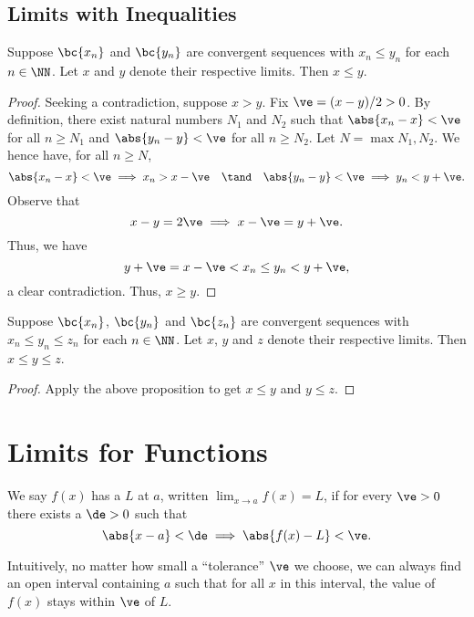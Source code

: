 \subsection{Limits with Inequalities}

\begin{proposition}
    Suppose $\bc{x_n}$ and $\bc{y_n}$ are convergent sequences with $x_n \leq y_n$ for each $n \in \NN$. Let $x$ and $y$ denote their respective limits. Then $x \leq y$.
\end{proposition}
\begin{proof}
    Seeking a contradiction, suppose $x > y$. Fix $\ve = (x-y)/2 > 0$. By definition, there exist natural numbers $N_1$ and $N_2$ such that $\abs{x_n - x} < \ve$ for all $n \geq N_1$ and $\abs{y_n - y} < \ve$ for all $n \geq N_2$. Let $N = \max{N_1, N_2}$. We hence have, for all $n \geq N$, \[\abs{x_n - x} < \ve \implies x_n > x - \ve \quad \tand \quad \abs{y_n - y} < \ve \implies y_n < y + \ve.\] Observe that \[x - y = 2\ve \implies x - \ve = y + \ve.\] Thus, we have \[y + \ve = x - \ve < x_n \leq y_n < y + \ve,\] a clear contradiction. Thus, $x \geq y$.
\end{proof}

\begin{theorem}
    Suppose $\bc{x_n}$, $\bc{y_n}$ and $\bc{z_n}$ are convergent sequences with $x_n \leq y_n \leq z_n$ for each $n \in \NN$. Let $x$, $y$ and $z$ denote their respective limits. Then $x \leq y \leq z$.
\end{theorem}
\begin{proof}
    Apply the above proposition to get $x \leq y$ and $y \leq z$.
\end{proof}

\section{Limits for Functions}

\begin{definition}
    We say $f(x)$ has a  $L$ at $a$, written $\displaystyle \lim_{x \to a} f(x) = L$, if for every $\ve > 0$ there exists a $\de > 0$ such that \[\abs{x - a} < \de \implies \abs{f(x) - L} < \ve.\]
\end{definition}

Intuitively, no matter how small a ``tolerance'' $\ve$ we choose, we can always find an open interval containing $a$ such that for all $x$ in this interval, the value of $f(x)$ stays within $\ve$ of $L$.

